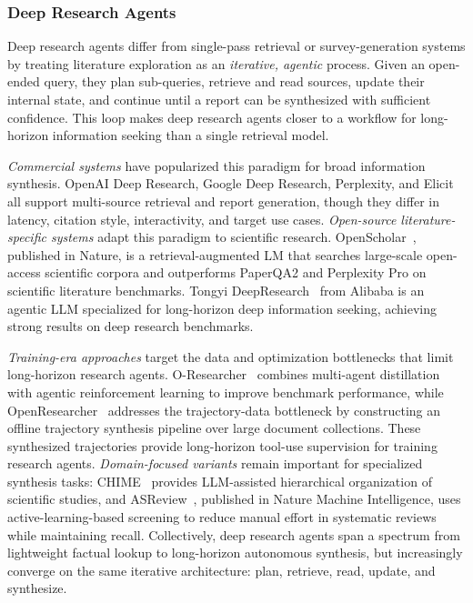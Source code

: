 \documentclass{llmxive}
\begin{document}
\subsubsection{Deep Research Agents}
\label{sec:deep_research}

Deep research agents differ from single-pass retrieval or survey-generation systems by treating literature exploration as an \emph{iterative, agentic} process. Given an open-ended query, they plan sub-queries, retrieve and read sources, update their internal state, and continue until a report can be synthesized with sufficient confidence. This loop makes deep research agents closer to a workflow for long-horizon information seeking than a single retrieval model.

\emph{Commercial systems} have popularized this paradigm for broad information synthesis. OpenAI Deep Research, Google Deep Research, Perplexity, and Elicit all support multi-source retrieval and report generation, though they differ in latency, citation style, interactivity, and target use cases. \emph{Open-source literature-specific systems} adapt this paradigm to scientific research. OpenScholar~\cite{openscholar2025}, published in Nature, is a retrieval-augmented LM that searches large-scale open-access scientific corpora and outperforms PaperQA2 and Perplexity Pro on scientific literature benchmarks. Tongyi DeepResearch~\cite{tongyi2025deepresearch} from Alibaba is an agentic LLM specialized for long-horizon deep information seeking, achieving strong results on deep research benchmarks.

\emph{Training-era approaches} target the data and optimization bottlenecks that limit long-horizon research agents. O-Researcher~\cite{oresearcher2026} combines multi-agent distillation with agentic reinforcement learning to improve benchmark performance, while OpenResearcher~\cite{li2026openresearcher} addresses the trajectory-data bottleneck by constructing an offline trajectory synthesis pipeline over large document collections. These synthesized trajectories provide long-horizon tool-use supervision for training research agents. \emph{Domain-focused variants} remain important for specialized synthesis tasks: CHIME~\cite{kang2024chime} provides LLM-assisted hierarchical organization of scientific studies, and ASReview~\cite{asreview2020}, published in Nature Machine Intelligence, uses active-learning-based screening to reduce manual effort in systematic reviews while maintaining recall. Collectively, deep research agents span a spectrum from lightweight factual lookup to long-horizon autonomous synthesis, but increasingly converge on the same iterative architecture: plan, retrieve, read, update, and synthesize.
\end{document}
